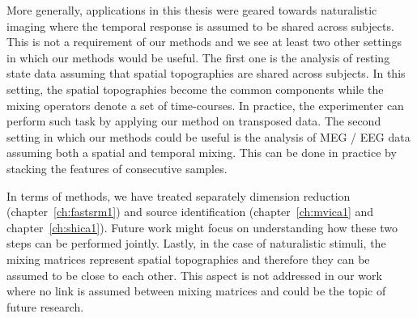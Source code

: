 \documentclass[ twoside,openright,titlepage,numbers=noenddot,%
                headinclude,footinclude,cleardoublepage=empty,abstract=on,
                BCOR=5mm,paper=a4,fontsize=11pt, 
                ]{scrreprt}
\begin{document}
More generally, applications in this thesis were geared towards naturalistic imaging where the temporal response is assumed to be shared
across subjects. This is not a requirement of our methods and we see at least two other
settings in which our methods would be useful. The first
one is the analysis of resting state data assuming that spatial topographies are
shared across subjects. In this setting, the spatial topographies become the
common components while the mixing operators denote a set of time-courses. In
practice, the experimenter can perform such task by applying our method on
transposed data.
The second setting in which our methods could be useful is the analysis of MEG / EEG data assuming both a spatial and
temporal mixing. This can be done in practice by stacking the features of
consecutive samples.

In terms of methods, we have treated separately dimension reduction
(chapter~\ref{ch:fastsrm1}) and source identification (chapter~\ref{ch:mvica1}
and chapter~\ref{ch:shica1}). Future work might focus on understanding how these
two steps can be performed jointly. Lastly, in the case of naturalistic stimuli,
the mixing matrices represent spatial topographies and therefore they can be
assumed to be close to each other. This aspect is not addressed in our work
where no link is assumed between mixing matrices and could be the topic of
future research.




\end{document}
